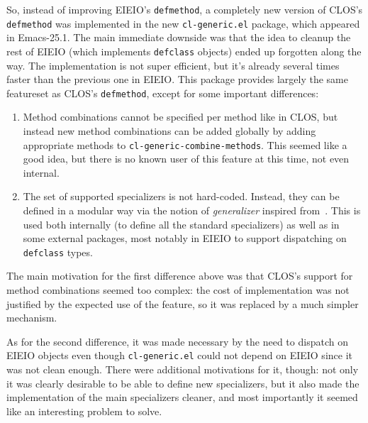 \documentclass[format=acmsmall, review]{acmart}
\begin{document}
So, instead of improving EIEIO's \texttt{defmethod}, a completely new
version of CLOS's \texttt{defmethod} was implemented in the new
\texttt{cl-generic.el} package, which appeared in Emacs-25.1.  The main
immediate downside was that the idea to cleanup the rest of EIEIO (which
implements \texttt{defclass} objects) ended up forgotten along the way.
The implementation is not super efficient, but it's already several times
faster than the previous one in EIEIO.  This package provides largely the
same featureset as CLOS's \texttt{defmethod}, except for some important
differences:
\begin{enumerate}
\item Method combinations cannot be specified per method like in CLOS, but
  instead new method combinations can be added globally by adding
  appropriate methods to \texttt{cl-\linebreak[0]generic-\linebreak[0]combine-\linebreak[0]methods}.  This seemed
  like a good idea, but there is no known user of this feature at this time,
  not even internal.
\item The set of supported specializers is not hard-coded.  Instead, they
  can be defined in a modular way via the notion of \emph{generalizer}
  inspired from~\cite{Rhodes14}.  This is used both internally (to define
  all the standard specializers) as well as in some external packages, most
  notably in EIEIO to support dispatching on \texttt{defclass} types.
\end{enumerate}
The main motivation for the first difference above was that CLOS's support
for method combinations seemed too complex: the cost of implementation was
not justified by the expected use of the feature, so it was replaced by
a much simpler mechanism.

As for the second difference, it was made necessary by the need to dispatch
on EIEIO objects even though \texttt{cl-generic.el} could not depend on
EIEIO since it was not clean enough.  There were additional motivations for
it, though: not only it was clearly desirable to be able to define new
specializers, but it also made the implementation of the main specializers
cleaner, and most importantly it seemed like an interesting problem
to solve.

\end{document}
